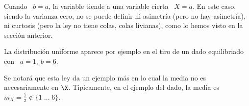 Cuando \ $b  = a$, la variable tiende a  una variable cierta \ $X  = a$. En este
caso, siendo la  varianza cero, no se puede definir ni  asimetr\'ia (pero no hay
asimetr\'ia), ni curtosis (pero la ley no tiene colas, \ie colas livianas), como
lo hemos visto en la secci\'on anterior.
%

La  distribuci\'on  uniforme  aparece  por   ejemplo  en  el  tiro  de  un  dado
equilibriado con \ $a = 1, \: b = 6$.


Se  notar\'a que  esta  ley da  un  ejemplo m\'as  en  lo cual  la  media no  es
necesariamente en $\X$. Tipicamente, en el  ejemplo del dado, la media es $m_X =
\frac72 \notin \{ 1 \; \ldots \; 6 \}$.
